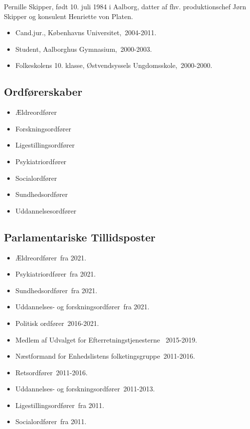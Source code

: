 \documentclass[11pt, a4paper]{awesome-cv}
\begin{document}
\makecvheader[R]
\makelettertitle
\begin{cvletter}
Pernille Skipper, født 10. juli 1984 i Aalborg, datter af fhv. produktionschef Jørn Skipper og konsulent Henriette von Platen.

\begin{itemize}
\item Cand.jur., Københavns Universitet, 2004-2011.
\item Student, Aalborghus Gymnasium, 2000-2003.
\item Folkeskolens 10. klasse, Østvendsyssels Ungdomsskole, 2000-2000.
\end{itemize}
\subsection*{Ordførerskaber}
\begin{itemize}
\item Ældreordfører
\item Forskningsordfører
\item Ligestillingsordfører
\item Psykiatriordfører
\item Socialordfører
\item Sundhedsordfører
\item Uddannelsesordfører
\end{itemize}
\subsection*{Parlamentariske Tillidsposter}
\begin{itemize}
\item Ældreordfører fra 2021.
\item Psykiatriordfører fra 2021.
\item Sundhedsordfører fra 2021.
\item Uddannelses- og forskningsordfører fra 2021.
\item Politisk ordfører 2016-2021.
\item Medlem af Udvalget for Efterretningstjenesterne  2015-2019.
\item Næstformand for Enhedslistens folketingsgruppe 2011-2016.
\item Retsordfører 2011-2016.
\item Uddannelses- og forskningsordfører 2011-2013.
\item Ligestillingsordfører fra 2011.
\item Socialordfører fra 2011.
\end{itemize}

\end{cvletter}
\end{document}
